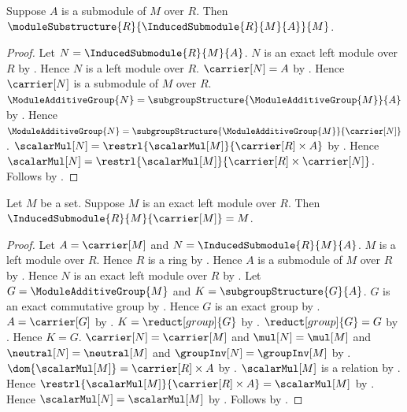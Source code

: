 \begin{theorem}\label{induced_submodule_is_module_substructure}
    Suppose $A$ is a submodule of $M$ over $R$.
    Then $\moduleSubstructure{R}{\InducedSubmodule{R}{M}{A}}{M}$.
\end{theorem}
\begin{proof}
    Let $N=\InducedSubmodule{R}{M}{A}$.
    $N$ is an exact left module over $R$ by
        .
    Hence $N$ is a left module over $R$.
    $\carrier[N]=A$ by .
    Hence $\carrier[N]$ is a submodule of $M$ over $R$.
    $\ModuleAdditiveGroup{N}
        =\subgroupStructure{\ModuleAdditiveGroup{M}}{A}$ by
        .
    Hence $\ModuleAdditiveGroup{N}
        =\subgroupStructure{\ModuleAdditiveGroup{M}}{\carrier[N]}$.
    $\scalarMul[N]
        =\restrl{\scalarMul[M]}{\carrier[R]\times A}$ by
        .
    Hence $\scalarMul[N]
        =\restrl{\scalarMul[M]}{
            \carrier[R]\times\carrier[N]}$.
    Follows by .
\end{proof}

\begin{theorem}\label{full_induced_submodule_eq}
    Let $M$ be a set.
    Suppose $M$ is an exact left module over $R$.
    Then $\InducedSubmodule{R}{M}{\carrier[M]}=M$.
\end{theorem}
\begin{proof}
    Let $A=\carrier[M]$ and
        $N=\InducedSubmodule{R}{M}{A}$.
    $M$ is a left module over $R$.
    Hence $R$ is a ring by .
    Hence $A$ is a submodule of $M$ over $R$ by
        .
    Hence $N$ is an exact left module over $R$ by
        .
    Let $G=\ModuleAdditiveGroup{M}$ and
        $K=\subgroupStructure{G}{A}$.
    $G$ is an exact commutative group by
        .
    Hence $G$ is an exact group by
        .
    $A=\carrier[G]$ by .
    $K=\reduct[group]{G}$ by
        .
    $\reduct[group]{G}=G$ by .
    Hence $K=G$.
    $\carrier[N]=\carrier[M]$ and
        $\mul[N]=\mul[M]$ and
        $\neutral[N]=\neutral[M]$ and
        $\groupInv[N]=\groupInv[M]$ by
        .
    $\dom{\scalarMul[M]}=\carrier[R]\times A$ by
        .
    $\scalarMul[M]$ is a relation by
        .
    Hence $\restrl{\scalarMul[M]}{\carrier[R]\times A}
        =\scalarMul[M]$ by .
    Hence $\scalarMul[N]=\scalarMul[M]$ by
        .
    Follows by .
\end{proof}

